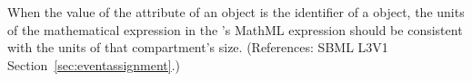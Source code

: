 When the value of the attribute  of an \EventAssignment
object is the identifier of a \Compartment object, the units of the
mathematical expression in the \EventAssignment's MathML 
expression should be consistent with the units of that compartment's size.
(References: SBML L3V1 Section~\ref{sec:eventassignment}.)
